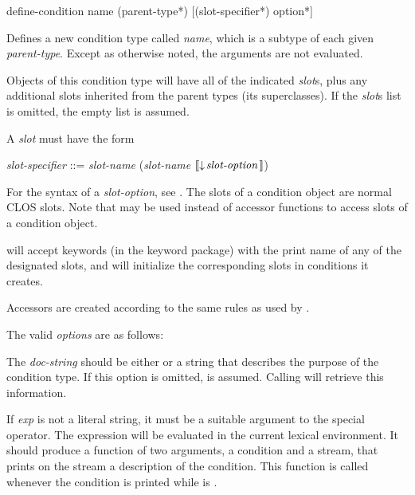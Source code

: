 \begin{defmac}
define-condition name ({parent-type}*)
                 [({slot-specifier}*) {option}*]

Defines a new condition type called \emph{name}, which is a
subtype of each given \emph{parent-type}.  Except as otherwise
noted, the arguments are not evaluated.

Objects of this condition type will have all of the indicated \emph{slot\/}s,
plus any additional slots inherited from the parent types (its superclasses).
If the \emph{slot\/}s list is omitted, the empty list is assumed.

A \emph{slot} must have the form
\begin{tabbing}
\emph{slot-specifier\/} ::= \emph{slot-name\/} {\Mor} (\emph{slot-name\/}  $\lbrack\!\lbrack\downarrow\!\emph{slot-option}\,\rbrack\!\rbrack$)
\end{tabbing}
For the syntax of a \emph{slot-option}, see .
The slots of a condition object are normal CLOS slots.
Note that  may be used instead of accessor functions to access slots of a
condition object.

 will accept keywords (in the keyword package) with the
print name of any of the designated slots, and will initialize the corresponding
slots in conditions it creates.

Accessors are created according to the same rules as used by .

The valid \emph{options} are as follows:

\begin{flushdesc}
\item[\cd{(:documentation \emph{doc-string})}]

  The \emph{doc-string} should be either  or a string that describes
  the purpose of the condition type. If this option is omitted,  is
  assumed.  Calling  will retrieve this
  information.

\item[\cd{(:report \emph{exp})}]

  If \emph{exp} is not a literal string, it must be a suitable argument to the
   special operator. The expression 
  will be evaluated in the current lexical environment. It should produce a
  function of two arguments, a condition and a stream, that prints on the stream
  a description of the condition. This function is called whenever the condition
  is printed while  is .


\end{flushdesc}
\end{defmac}
